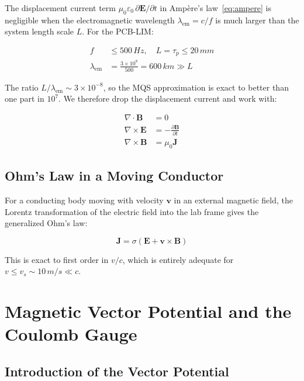 \documentclass[12pt, a4paper]{article}
\theoremstyle{plain}
\theoremstyle{definition}
\newcommand{\vB}{\mathbf{B}}
\newcommand{\vE}{\mathbf{E}}
\newcommand{\vJ}{\mathbf{J}}
\newcommand{\vv}{\mathbf{v}}
\newcommand{\taup}{\tau_p}
\newcommand{\sig}{\sigma}
\newcommand{\muZ}{\mu_0}
\newcommand{\Der}[2]{\frac{\partial #1}{\partial #2}}
\begin{document}
The displacement current term $\muZ \varepsilon_0 \,\partial \vE / \partial t$ in
Amp\`ere's law~\eqref{eq:ampere} is negligible when the electromagnetic wavelength
$\lambda_{\mathrm{em}} = c/f$ is much larger than the system length scale $L$. For
the PCB-LIM:

\begin{align}
  f &\leq 500\,\si{Hz}, \quad L = \taup \leq 20\,\si{mm} \nonumber\\
  \lambda_{\mathrm{em}} &= \frac{3\times10^8}{500} = 600\,\si{km} \gg L \nonumber
\end{align}

The ratio $L/\lambda_{\mathrm{em}} \sim 3\times10^{-8}$, so the MQS approximation
is exact to better than one part in $10^7$. We therefore drop the displacement current
and work with:

\begin{align}
  \nabla \cdot \vB &= 0 \label{eq:mqs1}\\
  \nabla \times \vE &= -\Der{\vB}{t} \label{eq:mqs2}\\
  \nabla \times \vB &= \muZ \vJ \label{eq:mqs3}
\end{align}

\subsection{Ohm's Law in a Moving Conductor}

For a conducting body moving with velocity $\vv$ in an external magnetic field, the
Lorentz transformation of the electric field into the lab frame gives the generalized
Ohm's law:

\begin{equation}
  \vJ = \sig \left( \vE + \vv \times \vB \right)
  \label{eq:ohm}
\end{equation}

This is exact to first order in $v/c$, which is entirely adequate for $v \leq v_s \sim
10\,\si{m/s} \ll c$.


\section{Magnetic Vector Potential and the Coulomb Gauge}
\label{sec:vectorpot}

\subsection{Introduction of the Vector Potential}
\end{document}
